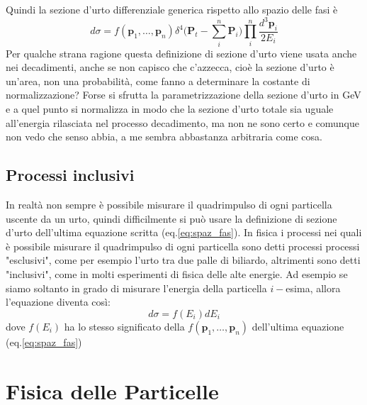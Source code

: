 \documentclass[11pt,a4paper]{report}
\newcommand{\vettore}[1]{\mathbf{#1}}
\begin{document}
		Quindi la sezione d'urto differenziale generica rispetto allo spazio delle fasi è
		\begin{equation}
			d\sigma=f(\vettore p_1,\dots,\vettore p_n)\delta^4\bigg(\vettore P_t-\sum_i^n \vettore P_i\bigg)\prod_i^n\frac{d^3\vettore p_i}{2E_i}
			\label{eq:spaz_fas}
		\end{equation} 
		Per qualche strana ragione questa definizione di sezione d'urto viene usata anche nei decadimenti, anche se non capisco che c'azzecca, cioè la sezione d'urto è un'area, non una probabilità, come fanno a determinare la costante di normalizzazione?\newline
		Forse si sfrutta la parametrizzazione della sezione d'urto in GeV e a quel punto si normalizza in modo che la sezione d'urto totale sia uguale all'energia rilasciata nel processo decadimento, ma non ne sono certo e comunque non vedo che senso abbia, a me sembra abbastanza arbitraria come cosa.


	\section{Processi inclusivi}
		In realtà non sempre è possibile misurare il quadrimpulso di ogni particella uscente da un urto, quindi difficilmente si può usare la definizione di sezione d'urto dell'ultima equazione scritta (eq.\ref{eq:spaz_fas}).\newline
		In fisica i processi nei quali è possibile misurare il quadrimpulso di ogni particella sono detti processi processi "esclusivi", come per esempio l'urto tra due palle di biliardo, altrimenti sono detti "inclusivi", come in molti esperimenti di fisica delle alte energie.\newline
		Ad esempio se siamo soltanto in grado di misurare l'energia della particella $i-$esima, allora l'equazione diventa così:
		\begin{equation}
			d\sigma=f(E_i)dE_i
		\end{equation}
		dove $f(E_i)$ ha lo stesso significato della $f(\vettore p_1,\dots,\vettore p_n)$ dell'ultima equazione (eq.\ref{eq:spaz_fas})















\chapter{Fisica delle Particelle}
\end{document}
